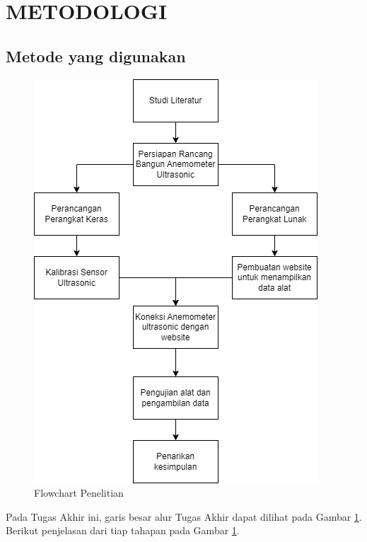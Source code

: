 \section{METODOLOGI}


\subsection{Metode yang digunakan}

\begin{figure}[h!]
	\centering
	\includegraphics[width=0.5\linewidth]{"gambar/Flowchart penelitian.drawio"}
	\caption{Flowchart Penelitian}
	\label{fig:flowchart-penelitian}
\end{figure}

Pada Tugas Akhir ini, garis besar alur Tugas Akhir dapat dilihat pada Gambar \ref*{fig:flowchart-penelitian}. Berikut penjelasan
dari tiap tahapan pada Gambar \ref{fig:flowchart-penelitian}.

